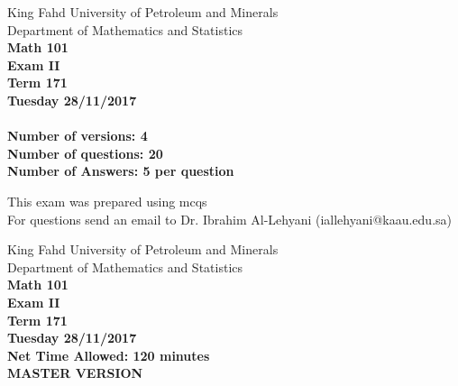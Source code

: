 \documentclass[amsfonts,bezier,leqno,fleqn,12pt,a4paper]{article}
\begin{document}
\begin{center}
\begin{large}

King Fahd University of Petroleum and Minerals\\
Department of Mathematics and Statistics\\
\vspace*{2cm}
{\bf Math 101}  \\
{\bf Exam II}  \\
{\bf Term 171}  \\
{\bf Tuesday 28/11/2017}  \\

\vspace*{3cm}
{\bf{\Huge{}}}\\
\vspace*{2cm}
{\bf Number of versions: 4 }  \\
{\bf Number of questions: 20 }  \\
{\bf Number of Answers: 5 per question}  \\

\end{large}
\vfill

\tiny{This exam was prepared using mcqs\\}
\tiny{For questions send an email to Dr. Ibrahim Al-Lehyani (iallehyani@kaau.edu.sa)\\}

\end{center}

\newpage


\thispagestyle{empty}

\begin{center}
\begin{large}

King Fahd University of Petroleum and Minerals\\
Department of Mathematics and Statistics\\
\vspace*{4cm}
{\bf Math 101} \\
{\bf Exam II}  \\
{\bf Term 171}  \\
{\bf Tuesday 28/11/2017}  \\
{\bf Net Time Allowed: 120 minutes}  \\
\vspace*{6cm}
{\bf {\Huge{MASTER VERSION}}}  \\

\end{large}
\end{center}
\end{document}
